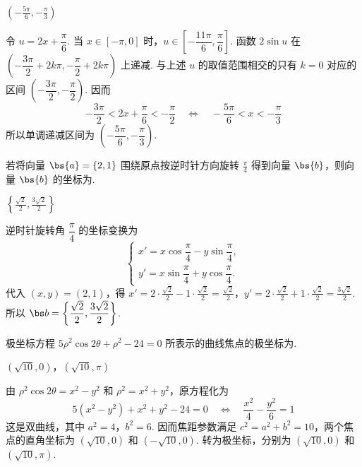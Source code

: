 \begin{answer}
\(\left(-\frac{5\pi}{6},-\frac{\pi}{3}\right)\)
\end{answer}

\begin{solution}
令 \(u=2x+\dfrac\pi6\). 当 \(x\in[-\pi,0]\) 时，\(u\in\left[-\dfrac{11\pi}{6},\dfrac\pi6\right]\). 函数 \(2\sin u\) 在 \(\left(-\dfrac{3\pi}{2}+2k\pi,-\dfrac\pi2+2k\pi\right)\) 上递减. 与上述 \(u\) 的取值范围相交的只有 \(k=0\) 对应的区间 \(\left(-\dfrac{3\pi}{2},-\dfrac\pi2\right)\). 因而
\[
-\frac{3\pi}{2}<2x+\frac\pi6<-\frac\pi2
\quad\Longleftrightarrow\quad
-\frac{5\pi}{6}<x<-\frac\pi3
\]
所以单调递减区间为 \(\left(-\dfrac{5\pi}{6},-\dfrac\pi3\right)\).
\end{solution}

\begin{problem}
若将向量 \(\bs{a} = \{2, 1\}\) 围绕原点按逆时针方向旋转 \(\frac{\pi}{4}\) 得到向量 \(\bs{b}\)，则向量 \(\bs{b}\) 的坐标为\fillinblank{}.
\end{problem}

\begin{answer}
\(\left\{\frac{\sqrt2}{2}, \frac{3\sqrt2}{2}\right\}\)
\end{answer}

\begin{solution}
逆时针旋转角 \(\dfrac\pi4\) 的坐标变换为
\[
\begin{cases}
x'=x\cos\dfrac\pi4-y\sin\dfrac\pi4,\\
y'=x\sin\dfrac\pi4+y\cos\dfrac\pi4.
\end{cases}
\]
代入 \((x,y)=(2,1)\)，得
\(x'=2\cdot\frac{\sqrt2}{2}-1\cdot\frac{\sqrt2}{2}=\frac{\sqrt2}{2}\)，\(y'=2\cdot\frac{\sqrt2}{2}+1\cdot\frac{\sqrt2}{2}=\frac{3\sqrt2}{2}\).
所以 \(\bs b=\left\{\dfrac{\sqrt2}{2},\dfrac{3\sqrt2}{2}\right\}\).
\end{solution}

\begin{problem}
极坐标方程 \(5\rho^2 \cos 2\theta + \rho^2 - 24 = 0\) 所表示的曲线焦点的极坐标为\fillinblank{}.
\end{problem}

\begin{answer}
\(\left(\sqrt{10},0\right)\)，\(\left(\sqrt{10},\pi\right)\)
\end{answer}

\begin{solution}
由 \(\rho^2\cos2\theta=x^2-y^2\) 和 \(\rho^2=x^2+y^2\)，原方程化为
\[
5(x^2-y^2)+x^2+y^2-24=0
\quad\Longleftrightarrow\quad
\frac{x^2}{4}-\frac{y^2}{6}=1
\]
这是双曲线，其中 \(a^2=4\)，\(b^2=6\). 因而焦距参数满足 \(c^2=a^2+b^2=10\)，两个焦点的直角坐标为 \((\sqrt{10},0)\) 和 \((-\sqrt{10},0)\). 转为极坐标，分别为 \(\left(\sqrt{10},0\right)\) 和 \(\left(\sqrt{10},\pi\right)\).
\end{solution}

